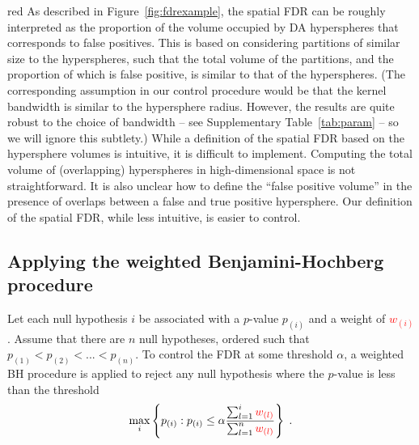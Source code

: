 \documentclass{article}
\newcommand\revised[1]{\textcolor{red}{#1}}
\begin{document}
\begin{color}{red}
As described in Figure~\ref{fig:fdrexample}, the spatial FDR can be roughly interpreted as the proportion of the volume occupied by DA hyperspheres that corresponds to false positives.
This is based on considering partitions of similar size to the hyperspheres, such that the total volume of the partitions, and the proportion of which is false positive, is similar to that of the hyperspheres.
(The corresponding assumption in our control procedure would be that the kernel bandwidth is similar to the hypersphere radius.
However, the results are quite robust to the choice of bandwidth -- see Supplementary Table~\ref{tab:param} -- so we will ignore this subtlety.)
While a definition of the spatial FDR based on the hypersphere volumes is intuitive, it is difficult to implement.
Computing the total volume of (overlapping) hyperspheres in high-dimensional space is not straightforward.
It is also unclear how to define the ``false positive volume'' in the presence of overlaps between a false and true positive hypersphere.
Our definition of the spatial FDR, while less intuitive, is easier to control.
\end{color}

\subsection{Applying the weighted Benjamini-Hochberg procedure}
Let each null hypothesis $i$ be associated with a $p$-value $p_{(i)}$ and a weight of \revised{$w_{(i)}$}.
Assume that there are $n$ null hypotheses, ordered such that $p_{(1)} < p_{(2)} < ... < p_{(n)}$.
To control the FDR at some threshold $\alpha$, a weighted BH procedure is applied \cite{benjamini1997multiple} to reject any null hypothesis where the $p$-value is less than the threshold
\[
    \max_i \left\{ p_{(i)} : p_{(i)} \le \alpha \frac{\sum_{l=1}^{i} \revised{w_{(l)}}}{\sum_{l=1}^{n} \revised{w_{(l)}}} \right\}  \;.
\]
\end{document}
